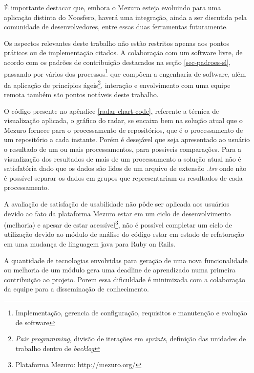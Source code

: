 É importante destacar que, embora o Mezuro esteja evoluindo para uma aplicação distinta do Noosfero, haverá uma integração, ainda a ser discutida pela comunidade de desenvolvedores, entre essas duas ferramentas futuramente.

Os aspectos relevantes deste trabalho não estão restritos apenas aos  pontos práticos ou de implementação citados. A colaboração com um software livre, de acordo com os padrões de contribuição destacados na seção \ref{sec-padroes-sl}, passando por vários dos processos\footnote{Implementação, gerencia de configuração, requisitos e manutenção e evolução de software} que compõem a engenharia de software, além da aplicação de princípios ágeis\footnote{\textit{Pair programming}, divisão de iterações em \textit{sprints}, definição das unidades de trabalho dentro de \textit{backlog}}, interação e envolvimento com uma equipe remota também são pontos notáveis deste trabalho.

O código presente no apêndice \ref{radar-chart-code}, referente a técnica de visualização aplicada, o gráfico do radar, se encaixa bem na solução atual que o Mezuro fornece para o processamento de repositórios, que é o processamento de um repositório a cada instante. Porém é desejável que seja apresentado ao usuário o resultado de um ou mais processamentos, para possíveis comparações. Para a visualização dos resultados de mais de um processamento a solução atual não é satisfatória dado que os dados são lidos de um arquivo de extensão \textit{.tsv} onde não é possível separar os dados em grupos que representariam os resultados de cada processamento.

A avaliação de satisfação de usabilidade não pôde ser aplicada aos usuários devido ao fato da plataforma Mezuro estar em um ciclo de desenvolvimento (melhoria) e apesar de estar acessível\footnote{Plataforma Mezuro: http://mezuro.org/}, não é possível completar um ciclo de utilização devido ao módulo de análise do código estar em estado de refatoração em uma mudança de linguagem java para Ruby on Rails.

A quantidade de tecnologias envolvidas para geração de uma nova funcionalidade ou melhoria de um módulo gera uma deadline de aprendizado numa primeira contribuição ao projeto. Porem essa dificuldade é minimizada com a colaboração da equipe para a disseminação de conhecimento.

